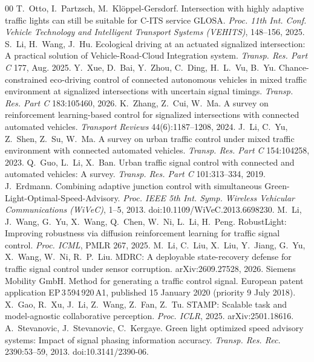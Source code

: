 \begin{thebibliography}{00}
 T.~Otto, I.~Partzsch, M.~Kl\"oppel-Gersdorf. Intersection with highly adaptive traffic lights can still be suitable for C-ITS service GLOSA. \emph{Proc. 11th Int. Conf. Vehicle Technology and Intelligent Transport Systems (VEHITS)}, 148--156, 2025.
 S.~Li, H.~Wang, J.~Hu. Ecological driving at an actuated signalized intersection: A practical solution of Vehicle-Road-Cloud Integration system. \emph{Transp. Res. Part C} 177, Aug. 2025.
 Y.~Xue, D.~Bai, Y.~Zhou, C.~Ding, H.~L.~Vu, B.~Yu. Chance-constrained eco-driving control of connected autonomous vehicles in mixed traffic environment at signalized intersections with uncertain signal timings. \emph{Transp. Res. Part C} 183:105460, 2026.
 K.~Zhang, Z.~Cui, W.~Ma. A survey on reinforcement learning-based control for signalized intersections with connected automated vehicles. \emph{Transport Reviews} 44(6):1187--1208, 2024.
 J.~Li, C.~Yu, Z.~Shen, Z.~Su, W.~Ma. A survey on urban traffic control under mixed traffic environment with connected automated vehicles. \emph{Transp. Res. Part C} 154:104258, 2023.
 Q.~Guo, L.~Li, X.~Ban. Urban traffic signal control with connected and automated vehicles: A survey. \emph{Transp. Res. Part C} 101:313--334, 2019.
 J.~Erdmann. Combining adaptive junction control with simultaneous Green-Light-Optimal-Speed-Advisory. \emph{Proc. IEEE 5th Int. Symp. Wireless Vehicular Communications (WiVeC)}, 1--5, 2013. doi:10.1109/WiVeC.2013.6698230.
 M.~Li, J.~Wang, G.~Yu, X.~Wang, Q.~Chen, W.~Ni, L.~Li, H.~Peng. RobustLight: Improving robustness via diffusion reinforcement learning for traffic signal control. \emph{Proc. ICML}, PMLR 267, 2025.
 M.~Li, C.~Liu, X.~Liu, Y.~Jiang, G.~Yu, X.~Wang, W.~Ni, R.~P.~Liu. MDRC: A deployable state-recovery defense for traffic signal control under sensor corruption. arXiv:2609.27528, 2026.
 Siemens Mobility GmbH. Method for generating a traffic control signal. European patent application EP\,3\,594\,920\,A1, published 15 January 2020 (priority 9 July 2018).
 X.~Gao, R.~Xu, J.~Li, Z.~Wang, Z.~Fan, Z.~Tu. STAMP: Scalable task and model-agnostic collaborative perception. \emph{Proc. ICLR}, 2025. arXiv:2501.18616.
 A.~Stevanovic, J.~Stevanovic, C.~Kergaye. Green light optimized speed advisory systems: Impact of signal phasing information accuracy. \emph{Transp. Res. Rec.} 2390:53--59, 2013. doi:10.3141/2390-06.

\end{thebibliography}
